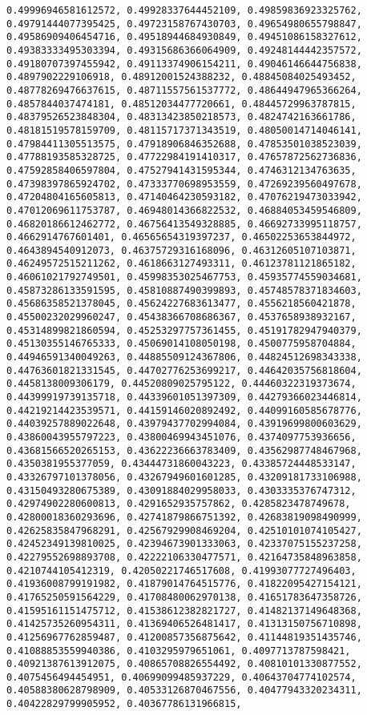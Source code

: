 \documentclass[11pt]{article}
\begin{document}
\begin{Verbatim}[commandchars=\\\{\}]
0.49996946581612572, 0.49928337644452109, 0.49859836923325762, 0.49791444077395425, 0.49723158767430703, 0.49654980655798847, 0.49586909406454716, 0.49518944684930849, 0.49451086158327612, 0.49383333495303394, 0.49315686366064909, 0.49248144442357572, 0.49180707397455942, 0.49113374906154211, 0.49046146644756838, 0.4897902229106918, 0.48912001524388232, 0.48845084025493452, 0.48778269476637615, 0.48711557561537772, 0.48644947965366264, 0.4857844037474181, 0.48512034477720661, 0.48445729963787815, 0.48379526523848304, 0.48313423850218573, 0.4824742163661786, 0.48181519578159709, 0.48115717371343519, 0.48050014714046141, 0.47984411305513575, 0.47918906846352688, 0.47853501038523039, 0.47788193585328725, 0.47722984191410317, 0.47657872562736836, 0.47592858406597804, 0.47527941431595344, 0.4746312134763635, 0.47398397865924702, 0.47333770698953559, 0.47269239560497678, 0.47204804165605813, 0.47140464230593182, 0.47076219473033942, 0.47012069611753787, 0.46948014366822532, 0.46884053459546809, 0.46820186612462772, 0.46756413549328885, 0.46692733995118757, 0.4662914767601401, 0.46565654319397237, 0.46502253653844972, 0.4643894540912073, 0.46375729316168096, 0.46312605107103871, 0.46249572515211262, 0.4618663127493311, 0.46123781121865182, 0.46061021792749501, 0.45998353025467753, 0.45935774559034681, 0.45873286133591595, 0.45810887490399893, 0.45748578371834603, 0.45686358521378045, 0.45624227683613477, 0.4556218560421878, 0.45500232029960247, 0.45438366708686367, 0.4537658938932167, 0.45314899821860594, 0.45253297757361455, 0.45191782947940379, 0.45130355146765333, 0.45069014108050198, 0.4500775958704884, 0.44946591340049263, 0.44885509124367806, 0.44824512698343338, 0.44763601821331545, 0.44702776253699217, 0.44642035756818604, 0.4458138009306179, 0.44520809025795122, 0.44460322319373674, 0.44399919739135718, 0.44339601051397309, 0.44279366023446814, 0.44219214423539571, 0.44159146020892492, 0.44099160585678776, 0.44039257889022648, 0.43979437702994084, 0.43919699800603629, 0.43860043955797223, 0.43800469943451076, 0.4374097753936656, 0.43681566520265153, 0.43622236663783409, 0.43562987748467968, 0.4350381955377059, 0.43444731860043223, 0.43385724448533147, 0.43326797101378056, 0.43267949601601285, 0.43209181733106988, 0.43150493280675389, 0.43091884029958033, 0.4303335376747312, 0.42974902280600813, 0.4291652935757862, 0.4285823478749678, 0.42800018360293696, 0.42741879866751392, 0.42683819098490999, 0.42625835847968291, 0.42567929908469204, 0.42510101074105427, 0.42452349139810025, 0.42394673901333063, 0.42337075155237258, 0.42279552698893708, 0.42222106330477571, 0.42164735848963858, 0.4210744105412319, 0.42050221746517608, 0.41993077727496403, 0.41936008799191982, 0.41879014764515776, 0.41822095427154121, 0.41765250591564229, 0.41708480062970138, 0.41651783647358726, 0.41595161151475712, 0.41538612382821727, 0.41482137149648368, 0.41425735260954311, 0.41369406526481417, 0.41313150756710898, 0.41256967762859487, 0.41200857356875642, 0.41144819351435746, 0.41088853559940386, 0.4103295979651061, 0.4097713787598421, 0.40921387613912075, 0.40865708826554492, 0.40810101330877552, 0.4075456494454951, 0.40699099485937229, 0.40643704774102574, 0.40588380628798909, 0.40533126870467556, 0.40477943320234311, 0.40422829799905952, 0.40367786131966815, 
\end{Verbatim}
\end{document}
